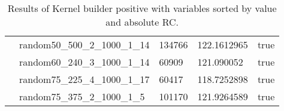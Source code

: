 \begin{table}[!htbp]
{\begin{tabular}{@{}lllll@{}}
                & random50\_500\_2\_1000\_1\_14 & 134766 & 122.1612965 & true \\ 
                & random60\_240\_3\_1000\_1\_14 & 60909 & 121.090052 & true \\ 
                & random75\_225\_4\_1000\_1\_17 & 60417 & 118.7252898 & true \\ 
                & random75\_375\_2\_1000\_1\_5 & 101170 & 121.9264589 & true \\ 
                \bottomrule
        \end{tabular}
        }
    \caption{Results of Kernel builder positive with variables sorted by value and absolute RC.}
    \label{tab:ker_pos_val_abs_RC}
\end{table}
